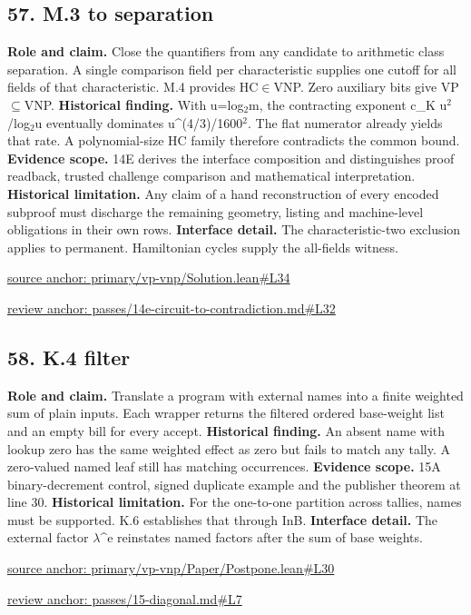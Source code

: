 \documentclass[11pt,letterpaper]{article}
\theoremstyle{definition}\newtheorem{definition}[theorem]{Definition}\newtheorem{example}[theorem]{Example}
\theoremstyle{remark}\newtheorem{remark}[theorem]{Remark}
\begin{document}
\subsection*{57. M.3 to separation}
\textbf{Role and claim.} Close the quantifiers from any candidate to arithmetic class separation. A single comparison field per characteristic supplies one cutoff for all fields of that characteristic. M.4 provides HC\ensuremath{\in}VNP. Zero auxiliary bits give VP\ensuremath{\subseteq}VNP.
\textbf{Historical finding.} With u=log\ensuremath{{}_2}m, the contracting exponent c\_K u\ensuremath{{}^2}/log\ensuremath{{}_2}u eventually dominates u\textasciicircum{}(4/3)/1600\ensuremath{{}^2}. The flat numerator already yields that rate. A polynomial-size HC family therefore contradicts the common bound.
\textbf{Evidence scope.} 14E derives the interface composition and distinguishes proof readback, trusted challenge comparison and mathematical interpretation.
\textbf{Historical limitation.} Any claim of a hand reconstruction of every encoded subproof must discharge the remaining geometry, listing and machine-level obligations in their own rows.
\textbf{Interface detail.} The characteristic-two exclusion applies to permanent. Hamiltonian cycles supply the all-fields witness.
\par\href{https://github.com/nousentllc/VP-VNP-Review/blob/8a7976933b6b2b4ffda1ad3a0dfb5fc6b6f023e8/primary/vp-vnp/Solution.lean\#L34}{source anchor: primary/vp-vnp/Solution.lean\#L34}
\par\href{https://github.com/nousentllc/VP-VNP-Review/blob/8a7976933b6b2b4ffda1ad3a0dfb5fc6b6f023e8/passes/14e-circuit-to-contradiction.md\#L32}{review anchor: passes/14e-circuit-to-contradiction.md\#L32}
\goodbreak
{}
\hypertarget{claim.58}{}
\subsection*{58. K.4 filter}
\textbf{Role and claim.} Translate a program with external names into a finite weighted sum of plain inputs. Each wrapper returns the filtered ordered base-weight list and an empty bill for every accept.
\textbf{Historical finding.} An absent name with lookup zero has the same weighted effect as zero but fails to match any tally. A zero-valued named leaf still has matching occurrences.
\textbf{Evidence scope.} 15A binary-decrement control, signed duplicate example and the publisher theorem at line 30.
\textbf{Historical limitation.} For the one-to-one partition across tallies, names must be supported. K.6 establishes that through InB.
\textbf{Interface detail.} The external factor \ensuremath{\lambda}\textasciicircum{}e reinstates named factors after the sum of base weights.
\par\href{https://github.com/nousentllc/VP-VNP-Review/blob/8a7976933b6b2b4ffda1ad3a0dfb5fc6b6f023e8/primary/vp-vnp/Paper/Postpone.lean\#L30}{source anchor: primary/vp-vnp/Paper/Postpone.lean\#L30}
\par\href{https://github.com/nousentllc/VP-VNP-Review/blob/8a7976933b6b2b4ffda1ad3a0dfb5fc6b6f023e8/passes/15-diagonal.md\#L7}{review anchor: passes/15-diagonal.md\#L7}
\goodbreak
\clearpage
{}
\hypertarget{claim.59}{}
\end{document}
